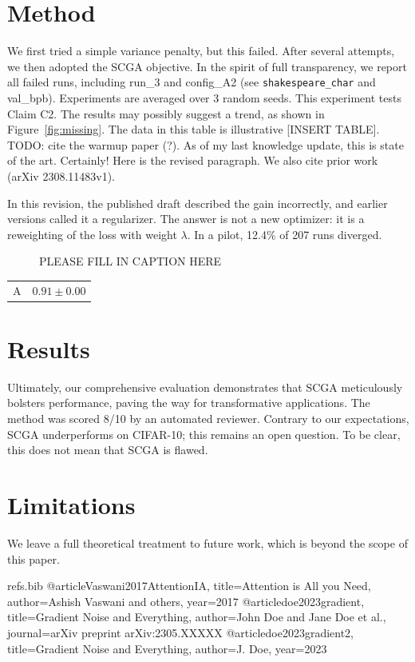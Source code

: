 \documentclass{article}
\begin{document}
\section{Method}
We first tried a simple variance penalty, but this failed. After several attempts, we then adopted the SCGA objective. In the spirit of full transparency, we report all failed runs, including run_3 and config_A2 (see \texttt{shakespeare\_char} and val\_bpb). Experiments are averaged over 3 random seeds. This experiment tests Claim C2. The results may possibly suggest a trend, as shown in Figure~\ref{fig:missing}. The data in this table is illustrative [INSERT TABLE]. TODO: cite the warmup paper (?). As of my last knowledge update, this is state of the art. Certainly! Here is the revised paragraph. We also cite prior work \citep{Vaswani2017AttentionIA,doe2023gradient} (arXiv 2308.11483v1).

In this revision, the published draft described the gain incorrectly, and earlier versions called it a regularizer. The answer is not a new optimizer: it is a reweighting of the loss with weight $\lambda$. In a pilot, 12.4\% of 207 runs diverged.

\begin{figure}[h]
\caption{PLEASE FILL IN CAPTION HERE}
\end{figure}

\begin{table}[h]
\begin{tabular}{lc}
A & $0.91 \pm 0.00$ \\
\end{tabular}
\end{table}

\section{Results}
Ultimately, our comprehensive evaluation demonstrates that SCGA meticulously bolsters performance, paving the way for transformative applications. The method was scored 8/10 by an automated reviewer. Contrary to our expectations, SCGA underperforms on CIFAR-10; this remains an open question. To be clear, this does not mean that SCGA is flawed.

\section{Limitations}
We leave a full theoretical treatment to future work, which is beyond the scope of this paper.

\begin{filecontents}{refs.bib}
@article{Vaswani2017AttentionIA, title={Attention is All you Need}, author={Ashish Vaswani and others}, year={2017}}
@article{doe2023gradient, title={Gradient Noise and Everything}, author={John Doe and Jane Doe et al.}, journal={arXiv preprint arXiv:2305.XXXXX}}
@article{doe2023gradient2, title={Gradient Noise and Everything}, author={J. Doe}, year={2023}}
\end{filecontents}
\end{document}
